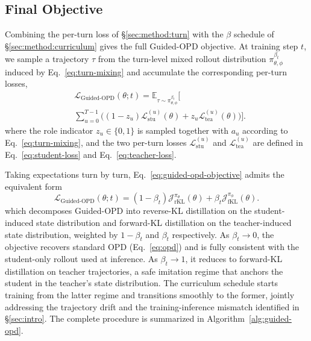 \documentclass[11pt]{article}
\begin{document}
\subsection{Final Objective}
\label{sec:method:objective}

Combining the per-turn loss of \S\ref{sec:method:turn} with the $\beta$ schedule of \S\ref{sec:method:curriculum} gives the full Guided-OPD objective. At training step $t$, we sample a trajectory $\tau$ from the turn-level mixed rollout distribution $\pi_{\theta, \phi}^{\beta_t}$ induced by Eq.~\ref{eq:turn-mixing} and accumulate the corresponding per-turn losses,
\begin{equation}
\begin{aligned}
&\mathcal{L}_{\text{Guided-OPD}}(\theta; t)
= \mathbb{E}_{\tau \sim \pi_{\theta,\phi}^{\beta_t}}
\!\Bigg[ \\[-0.25em]
&\sum_{u=0}^{T-1}
\Big(
(1-z_u)\mathcal{L}_{\text{stu}}^{(u)}(\theta)
+ z_u\mathcal{L}_{\text{tea}}^{(u)}(\theta)
\Big)
\Bigg].
\end{aligned}
\label{eq:guided-opd-objective}
\end{equation}
where the role indicator $z_u \in \{0, 1\}$ is sampled together with $a_u$ according to Eq.~\ref{eq:turn-mixing}, and the two per-turn losses $\mathcal{L}_{\text{stu}}^{(u)}$ and $\mathcal{L}_{\text{tea}}^{(u)}$ are defined in Eq.~\ref{eq:student-loss} and Eq.~\ref{eq:teacher-loss}.

Taking expectations turn by turn, Eq.~\ref{eq:guided-opd-objective} admits the equivalent form
{\small
\begin{equation}
    \mathcal{L}_{\text{Guided-OPD}}(\theta;t)
    = (1-\beta_t)\mathcal{J}_{\mathrm{rKL}}^{\pi_\theta}(\theta)
    + \beta_t\mathcal{J}_{\mathrm{fKL}}^{\pi_\phi}(\theta).
    \label{eq:guided-opd-expectation}
\end{equation}
}
which decomposes Guided-OPD into reverse-KL distillation on the student-induced state distribution and forward-KL distillation on the teacher-induced state distribution, weighted by $1-\beta_t$ and $\beta_t$ respectively. As $\beta_t \to 0$, the objective recovers standard OPD (Eq.~\ref{eq:opd}) and is fully consistent with the student-only rollout used at inference. As $\beta_t \to 1$, it reduces to forward-KL distillation on teacher trajectories, a safe imitation regime that anchors the student in the teacher's state distribution. The curriculum schedule starts training from the latter regime and transitions smoothly to the former, jointly addressing the trajectory drift and the training-inference mismatch identified in \S\ref{sec:intro}. The complete procedure is summarized in Algorithm~\ref{alg:guided-opd}.
\end{document}
